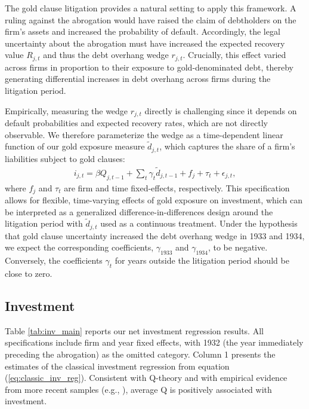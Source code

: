 The gold clause litigation provides a natural setting to apply this framework. A ruling against the abrogation would have raised the claim of debtholders on the firm's assets and increased the probability of default. Accordingly, the legal uncertainty about the abrogation must have increased the expected recovery value $R_{j,t}$ and thus the debt overhang wedge $r_{j,t}$. Crucially, this effect varied across firms in proportion to their exposure to gold-denominated debt, thereby generating differential increases in debt overhang across firms during the litigation period.

Empirically, measuring the wedge $r_{j,t}$ directly is challenging since it depends on default probabilities and expected recovery rates, which are not directly observable. We therefore parameterize the wedge as a time-dependent linear function of our gold exposure measure $\tilde{d}_{j,t}$, which captures the share of a firm's liabilities subject to gold clauses:
\begin{align}
\label{eq:parameterization}
i_{j,t} = \beta Q_{j,t-1} + \sum_{t} \gamma_{t} \tilde{d}_{j,t-1} + f_{j} + \tau_{t} + \epsilon_{j,t},
\end{align}
where $f_{j}$ and $\tau_{t}$ are firm and time fixed-effects, respectively. This specification allows for flexible, time-varying effects of gold exposure on investment, which can be interpreted as a generalized difference-in-differences design around the litigation period with $\tilde{d}_{j,t}$ used as a continuous treatment. Under the hypothesis that gold clause uncertainty increased the debt overhang wedge in 1933 and 1934, we expect the corresponding coefficients, $\gamma_{1933}$ and $\gamma_{1934}$, to be negative. Conversely, the coefficients $\gamma_t$ for years outside the litigation period should be close to zero.

\subsection{Investment}
\label{sec:investment}
\noindent Table \ref{tab:inv_main} reports our net investment regression results. All specifications include firm and year fixed effects, with 1932 (the year immediately preceding the abrogation) as the omitted category. Column 1 presents the estimates of the classical investment regression from equation (\ref{eq:classic_inv_reg}). Consistent with Q-theory and with empirical evidence from more recent samples (e.g., \cite{Peters2017}), average Q is positively associated with investment.

